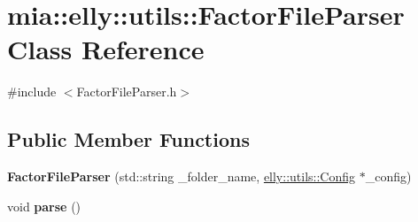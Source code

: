 \hypertarget{classmia_1_1elly_1_1utils_1_1_factor_file_parser}{\section{mia\-:\-:elly\-:\-:utils\-:\-:Factor\-File\-Parser Class Reference}
\label{classmia_1_1elly_1_1utils_1_1_factor_file_parser}
}


{\ttfamily \#include $<$Factor\-File\-Parser.\-h$>$}

\subsection*{Public Member Functions}
\begin{DoxyCompactItemize}
\item 
\hypertarget{classmia_1_1elly_1_1utils_1_1_factor_file_parser_a96a66a45bba45334c0e6c27f6f37a014}{{\bfseries Factor\-File\-Parser} (std\-::string \-\_\-folder\-\_\-name, \hyperlink{classmia_1_1elly_1_1utils_1_1_config}{elly\-::utils\-::\-Config} $\ast$\-\_\-config)}\label{classmia_1_1elly_1_1utils_1_1_factor_file_parser_a96a66a45bba45334c0e6c27f6f37a014}

\item 
\hypertarget{classmia_1_1elly_1_1utils_1_1_factor_file_parser_a7e4ab3e5026f1daa511bf4eb813200da}{void {\bfseries parse} ()}\label{classmia_1_1elly_1_1utils_1_1_factor_file_parser_a7e4ab3e5026f1daa511bf4eb813200da}

\end{DoxyCompactItemize}
